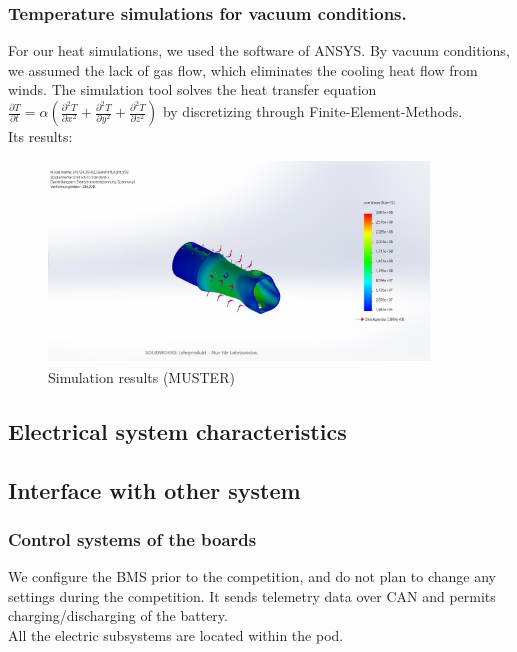 \subsubsection{Temperature simulations for vacuum conditions.}
For our heat simulations, we used the software of ANSYS. By vacuum conditions, we assumed the
lack of gas flow, which eliminates the cooling heat flow from winds. The simulation tool solves
the heat transfer equation \( \frac{\partial T}{\partial t} = \alpha \left( \frac{\partial^2 T}{\partial x^2} + \frac{\partial^2 T}{\partial y^2} + \frac{\partial^2 T}{\partial z^2} \right) \)
by discretizing through Finite-Element-Methods. \\
Its results:
\begin{figure}[H]
    \centering
    \includegraphics[width=0.9\textwidth]{texfiles/elec/eimg/SimulationTemplate}
    \caption{Simulation results (MUSTER)}
    \label{img: simresults_battery}
\end{figure}

\subsection{Electrical system characteristics}

\subsection{Interface with other system}
\subsubsection{Control systems of the boards}
We configure the BMS prior to the competition, and do not plan to change any settings during the competition. It sends telemetry data over CAN and permits charging/discharging of the battery. \\
All the electric subsystems are located within the pod. \\

